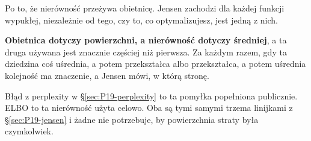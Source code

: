 \begin{fr}
\begin{ansblock}
Po to, że nierówność przeżywa obietnicę. Jensen zachodzi dla każdej funkcji
wypukłej, niezależnie od tego, czy to, co optymalizujesz, jest jedną z nich.
\end{ansblock}

\textbf{Obietnica dotyczy powierzchni, a nierówność dotyczy średniej}, a ta
druga używana jest znacznie częściej niż pierwsza. Za każdym razem, gdy ta
dziedzina coś uśrednia, a potem przekształca \dash{} albo przekształca, a
potem uśrednia \dash{} kolejność ma znaczenie, a Jensen mówi, w którą stronę.

Błąd z perplexity w \S\ref{sec:P19-perplexity} to ta pomyłka popełniona
publicznie. ELBO to ta nierówność użyta celowo. Oba są tymi samymi trzema
linijkami z \S\ref{sec:P19-jensen} i żadne nie potrzebuje, by powierzchnia
straty była czymkolwiek.
\end{fr}


